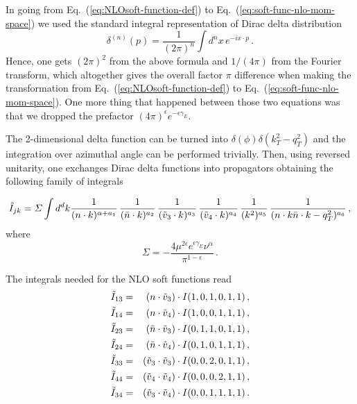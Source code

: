 \documentclass[a4paper,11pt]{report}
\numberwithin{equation}{section}
\begin{document}
In going from  Eq.~(\ref{eq:NLOsoft-function-def}) to
Eq.~(\ref{eq:soft-func-nlo-mom-space}) we used the standard integral
representation of Dirac delta distribution
%
\begin{equation}
  \delta^{(n)}(p) = 
  \frac{1}{(2\pi)^n} \int d^n x\, e^{-i x \cdot p}\,.
\end{equation}
%
Hence, one gets $(2\pi)^2$ from the above formula and $1/(4\pi)$ from the
Fourier transform, which altogether gives the overall factor $\pi$ difference
when making the transformation from Eq.~(\ref{eq:NLOsoft-function-def}) to
Eq.~(\ref{eq:soft-func-nlo-mom-space}). One more thing that happened between
those two equations was that we dropped the \msbar prefactor 
$(4\pi)^\epsilon e^{-\epsilon \gamma_E}$.

The 2-dimensional delta function can be turned into $\delta(\phi)
\delta(k_T^2-q_T^2)$ and the integration over azimuthal angle can be performed
trivially. Then, using reversed unitarity, one exchanges Dirac delta functions
into propagators obtaining the following family of integrals~\cite{AntoniaMTh}

\begin{equation}
  \tilde I_{jk} = 
  \Sigma
  \int d^d k
  \frac{1}{(n\cdot k)^{\alpha+a_1}}\,
  \frac{1}{(\bar{n} \cdot k)^{a_2}}\,
  \frac{1}{(\tilde v_3 \cdot k)^{a_3}}\,
  \frac{1}{(\tilde v_4 \cdot k)^{a_4}}\,
  \frac{1}{(k^2)^{a_5}}\,
  \frac{1}{(n\cdot k \bar{n} \cdot k -q_T^2)^{a_6}}\,,
  \label{eq:soft-func-nlo-family}
\end{equation}
%
where 
%
\begin{equation}
  \Sigma = 
  -\frac{4\mu^{2\epsilon} e^{\epsilon \gamma_E} \nu^\alpha}{\pi^{1-\epsilon}}\,.
  \label{eq:NLO-revunit-prefac}
\end{equation}

The integrals needed for the NLO soft functions read
%
\begin{eqnarray}
  \tilde I_{13} & = &(n\cdot \tilde v_3) \cdot I(1,0,1,0,1,1)\,,
  \nonumber \\
  \tilde I_{14} & = &(n\cdot \tilde v_4) \cdot I(1,0,0,1,1,1)\,,
  \nonumber \\
  \tilde I_{23} & = &(\bar{n}\cdot \tilde v_3) \cdot I(0,1,1,0,1,1)\,,
  \nonumber \\
  \tilde I_{24} & = &(\bar{n}\cdot \tilde v_4) \cdot I(0,1,0,1,1,1)\,,
  \label{eq:NLO-soft-integrals}
  \\
  \tilde I_{33} & = &(\tilde v_3 \cdot \tilde v_3) \cdot I(0,0,2,0,1,1)\,,
  \nonumber \\
  \tilde I_{44} & = &(\tilde v_4 \cdot \tilde v_4) \cdot I(0,0,0,2,1,1)\,,
  \nonumber \\
  \tilde I_{34} & = &(\tilde v_3 \cdot \tilde v_4) \cdot I(0,0,1,1,1,1)\,.
  \nonumber
\end{eqnarray}
\end{document}
